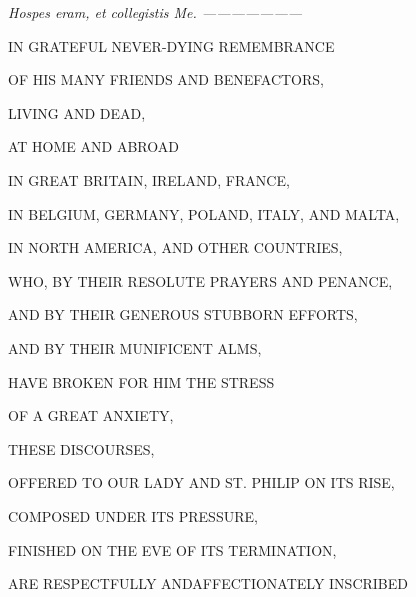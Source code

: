 

\emph{\emph{ Hospes eram, et collegistis
Me}. ———————}




IN GRATEFUL NEVER-DYING
REMEMBRANCE


OF HIS MANY FRIENDS AND BENEFACTORS,


LIVING AND DEAD,


AT HOME AND ABROAD





IN GREAT BRITAIN, IRELAND,
FRANCE,





IN BELGIUM, GERMANY, POLAND,
ITALY, AND MALTA,





IN NORTH AMERICA, AND OTHER
COUNTRIES,





WHO, BY THEIR RESOLUTE PRAYERS
AND PENANCE,





AND BY THEIR GENEROUS STUBBORN
EFFORTS,





AND BY THEIR MUNIFICENT ALMS,





HAVE BROKEN FOR HIM THE STRESS





OF A GREAT ANXIETY,





THESE DISCOURSES,





OFFERED TO OUR LADY AND ST.
PHILIP ON ITS RISE,





COMPOSED UNDER ITS PRESSURE,





FINISHED ON THE EVE OF ITS
TERMINATION,





ARE RESPECTFULLY AND\emph{}AFFECTIONATELY
INSCRIBED






